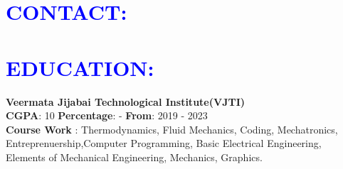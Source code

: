 \documentclass{article}
\begin{document}
\begin{multicols}{2}

\section*{\large{\textcolor{blue}{\uppercase{contact:}}}} 

\vspace{10pt}
\section*{\large{\textcolor{blue}{\uppercase{education:}}}}

\begin{flushleft}

{\textbf{Veermata Jijabai Technological Institute(VJTI)}}\\{\textbf{CGPA}}: 10 \hspace{5mm} {\textbf{Percentage}}: - \hspace{5mm} {\textbf{From}}: 2019 - 2023\\
{\textbf{Course Work}} : Thermodynamics, Fluid Mechanics, Coding, Mechatronics, Entreprenuership,Computer Programming, Basic Electrical Engineering, Elements of Mechanical Engineering, Mechanics, Graphics.\\


\end{flushleft}
\end{multicols}
\end{document}
